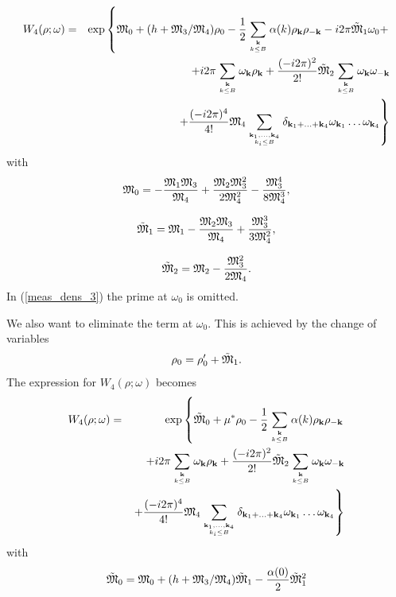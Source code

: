 \begin{eqnarray}
	\label{meas_dens_3}
	W_4(\rho;\omega) &=& \exp \left\{\frak M_0 + (h + \frak M_3/\frak M_4)\rho_0
	- \frac12  \sum\limits_{{\vb k}\atop k\le B} \alpha(k) \rho_{\vb k} \rho_{-{\vb k}}
	- i2\pi \tilde{\frak M}_1 \omega_0 + \right.  \nonumber\\
	&&
	+ i2\pi \sum\limits_{{\vb k} \atop k\le B} \omega_{\vb k} \rho_{\vb k}
	+ \frac{(-i2\pi)^2}{2!}\tilde{\frak M}_2 \sum\limits_{{\vb k} \atop k\le B} \omega_{\vb k} \omega_{-\vb k}
	\nonumber\\
	&& \left. +
	\frac{(-i2\pi)^4}{4!} 
	{\frak M}_4
	\sum\limits_{\vb{k}_1,\dotsc,\vb{k}_4\atop{k_i \le B}}
	\delta_{\vb{k}_1 + \dotsc + \vb{k}_4} 
	\omega_{{\vb k}_1} \dots \omega_{{\vb k}_4} \right\}
\end{eqnarray}
with
\begin{equation}
	\label{def:M_0}
	\frak M_0 = -\frac{\frak M_1 \frak M_3}{\frak M_4} + \frac{\frak M_2 \frak M_3^2}{2 \frak M_4^2}
	- \frac{\frak M_3^4}{8\frak M_4^3},
\end{equation}

\begin{equation}
	\label{def:tilde_M_1}
	\tilde{\frak M}_1 = \frak M_1 -\frac{\frak M_2 \frak M_3}{\frak M_4} + \frac{\frak M_3^3}{3\frak M_4^2},
\end{equation}

\begin{equation}
	\label{def:tilde_M_2}
	\tilde{\frak M}_2 = \frak M_2 - \frac{\frak M_3^2}{2 \frak M_4}.
\end{equation}
In (\ref{meas_dens_3}) the prime at $\omega_0$ is omitted.

We also want to eliminate the term at $\omega_0$. This is achieved by the change of variables
\begin{equation}
\rho_0 = \rho'_0 + \tilde{\frak M}_1.
\end{equation}
The expression for $W_4(\rho; \omega)$ becomes
\begin{eqnarray}
	\label{meas_dens_4}
	W_4(\rho;\omega) &=& \exp \left\{\tilde{\frak M}_0 + \mu^*\rho_0
	- \frac12  \sum\limits_{{\vb k}\atop k\le B} \alpha(k) \rho_{\vb k} \rho_{-{\vb k}} \right.  \nonumber\\
	&&
	+ i2\pi \sum\limits_{{\vb k} \atop k\le B} \omega_{\vb k} \rho_{\vb k}
	+ \frac{(-i2\pi)^2}{2!}\tilde{\frak M}_2 \sum\limits_{{\vb k} \atop k\le B} \omega_{\vb k} \omega_{-\vb k}
	\nonumber\\
	&& \left. +
	\frac{(-i2\pi)^4}{4!} 
	{\frak M}_4
	\sum\limits_{\vb{k}_1,\dotsc,\vb{k}_4\atop{k_i \le B}}
	\delta_{\vb{k}_1 + \dotsc + \vb{k}_4} 
	\omega_{{\vb k}_1} \dots \omega_{{\vb k}_4} \right\}
\end{eqnarray}
with
\begin{equation}
\label{tilde_frak_M0}
\tilde{\frak M}_0 = \frak M_0 + (h + {\frak M_3}/{\frak M_4})\tilde{\frak M}_1 - \frac{\alpha(0)}{2}\tilde{\frak M}_1^2
\end{equation}


